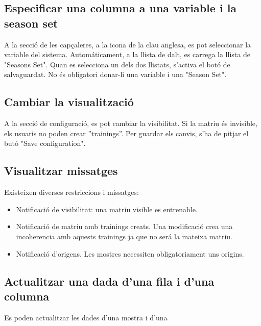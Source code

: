 \begin{itemize}
\subsection{Especificar una columna a una variable i la season set}
A la secci\'{o} de les capçaleres, a la icona de la clau anglesa, es pot seleccionar la variable del sistema. Autom\'{a}ticament, a la llista de dalt, es carrega la llista de "Seasons Set". Quan es selecciona un dels dos llistats, s'activa el bot\'{o} de salvaguardat. No \'{e}s obligatori donar-li una variable i una "Season Set".

\subsection{Cambiar la visualitzaci\'{o}}
A la secci\'{o} de configuraci\'{o}, es pot cambiar la visibilitat. Si la matriu \'{e}s invisible, els usuaris no poden crear ''trainings''. Per guardar els canvis, s'ha de pitjar el but\'{o} "Save configuration".

\subsection{Visualitzar missatges}
Existeixen diverses restriccions i missatges:
\begin{itemize}
\item Notificaci\'{o} de visibilitat: una matriu visible es entrenable. 
\item Notificaci\'{o} de matriu amb trainings creats. Una modificaci\'{o} crea una incoherencia amb aquests trainings ja que no ser\'{a} la mateixa matriu.
\item Notificaci\'{o} d'origens. Les mostres necessiten obligatoriament uns origins.
\end{itemize}

\subsection{Actualitzar una dada d'una fila i d'una columna}
Es poden actualitzar les dades d'una mostra i d'una 


\end{itemize}
